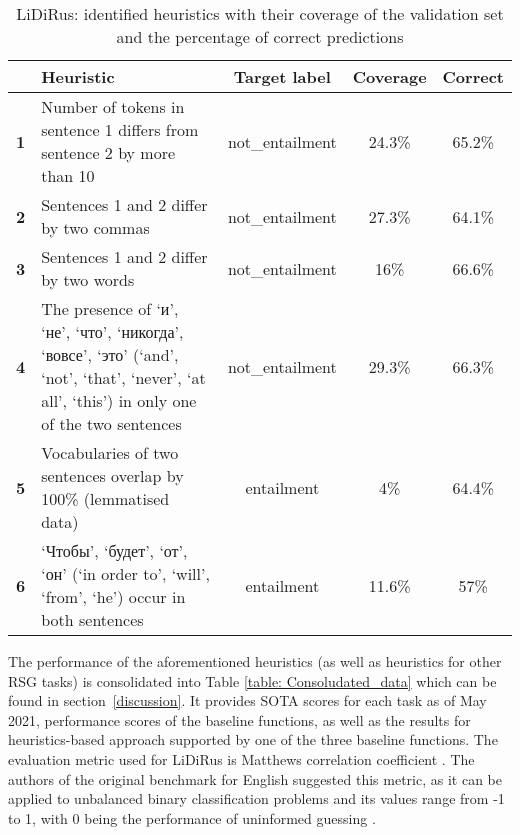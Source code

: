 \documentclass[11pt]{article}
\begin{document}
\begin{table}[t]
\centering
    \begin{tabular}{|c|p{}|c|c|c|}
        \hline
        & \textbf{Heuristic} & \textbf{Target label} & \textbf{Coverage} & \textbf{Correct} \\
        \hline
        \textbf{1} & Number of tokens in sentence 1 differs from sentence 2 by more than 10 & not\_entailment & 24.3\%  & 65.2\% \\
        \hline
        \textbf{2} & Sentences 1 and 2 differ by two commas & not\_entailment & 27.3\% & 64.1\% \\
        \hline
        \textbf{3} & Sentences 1 and 2 differ by two words & not\_entailment & 16\% & 66.6\% \\
        \hline
        \textbf{4} & The presence of \foreignlanguage{russian}{`и', `не', `что', `никогда', `вовсе', `это'} (`and', `not', `that', `never', `at all', `this') in only one of the two sentences & not\_entailment & 29.3\% & 66.3\% \\
        \hline
        \textbf{5} & Vocabularies of two sentences overlap by 100\% (lemmatised data) & entailment & 4\% & 64.4\% \\
        \hline
        \textbf{6} & \foreignlanguage{russian}{`Чтобы', `будет', `от', `он'} (`in order to', `will', `from', `he') occur in both sentences & entailment & 11.6\% & 57\% \\
        \hline
    \end{tabular}

    \caption{LiDiRus: identified heuristics with their coverage of the validation set and the percentage of correct predictions}
    \label{table:LiDiRus_heuristics}
\end{table}
   
The performance of the aforementioned heuristics (as well as heuristics for other RSG tasks) is consolidated into Table \ref{table: Consoludated_data} which can be found in section~\ref{discussion}. It provides SOTA scores for each task as of May 2021, performance scores of the baseline functions, as well as the results for heuristics-based approach supported by one of the three baseline functions. The evaluation metric used for LiDiRus is Matthews correlation coefficient \cite{MATTHEWS1975442}. The authors of the original benchmark for English suggested this metric, as it can be applied to unbalanced binary classification problems and its values range from -1 to 1, with 0 being the performance of uninformed guessing \cite{wang-etal-2018-glue}. 
\end{document}
